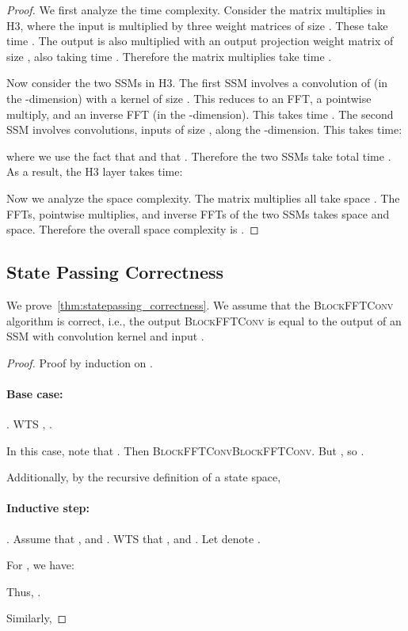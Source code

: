 \documentclass{article}
\newcommand{\hthree}{\textsc{H3}\xspace}
\begin{document}
\begin{proof}
  We first analyze the time complexity.
  Consider the matrix multiplies in \hthree, where the input  is
  multiplied by three weight matrices of size . These take time .
  The output  is also multiplied with an output projection weight matrix of
  size , also taking time .
  Therefore the matrix multiplies take time .

  Now consider the two SSMs in \hthree. The first SSM involves a convolution of
   (in the -dimension) with a kernel of size .
  This reduces to an FFT, a pointwise multiply, and an inverse FFT (in the
  -dimension).
  This takes time .
  The second SSM involves  convolutions, inputs of size ,
  along the -dimension.
  This takes time:
  
  where we use the fact that  and that .
  Therefore the two SSMs take total time .
  As a result, the \hthree layer takes time:
  

  Now we analyze the space complexity.
  The matrix multiplies all take space .
  The FFTs, pointwise multiplies, and inverse FFTs of the two SSMs takes 
  space and  space.
  Therefore the overall space complexity is .

\end{proof}


\subsection{State Passing Correctness}
\label{sec:app_statepassing_correctness_proof}

We prove~\cref{thm:statepassing_correctness}.
We assume that the \textsc{BlockFFTConv} algorithm is correct, i.e., the output \textsc{BlockFFTConv} is equal to the output of an SSM with convolution kernel  and input .

\begin{proof}  
Proof by induction on .

\paragraph{Base case:} .
WTS , .

In this case, note that .
Then \textsc{BlockFFTConv}\textsc{BlockFFTConv}.
But , so .

Additionally, by the recursive definition of a state space,


\paragraph{Inductive step:} .
Assume that , and .
WTS that , and .
Let  denote .

For , we have:

Thus, .

Similarly,

\end{proof}
\end{document}

